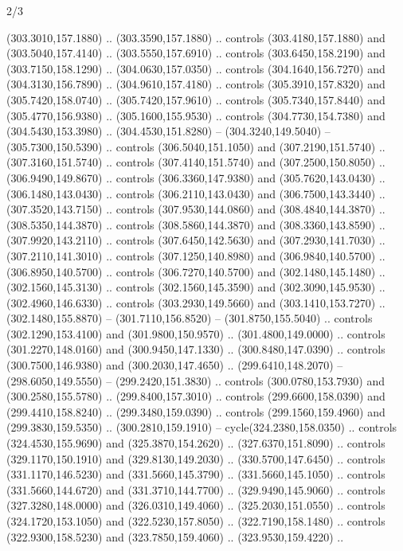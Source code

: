 \begin{flagdescription}{2/3}
\begin{scope}[xshift=0.5\flaglength,yshift=0.5\flagwidth,scale=\stretchfactor]
\begin{scope}[scale=0.001645\flagwidth,yshift=65mm,xshift=-63mm]
\begin{scope}[y=0.80pt, x=0.80pt, yscale=-1,]
\begin{scope}[cm={{1.33333,0.0,0.0,1.33333,(0.0,1e-05)}}]
  (303.3010,157.1880) .. (303.3590,157.1880) .. controls (303.4180,157.1880) and
  (303.5040,157.4140) .. (303.5550,157.6910) .. controls (303.6450,158.2190) and
  (303.7150,158.1290) .. (304.0630,157.0350) .. controls (304.1640,156.7270) and
  (304.3130,156.7890) .. (304.9610,157.4180) .. controls (305.3910,157.8320) and
  (305.7420,158.0740) .. (305.7420,157.9610) .. controls (305.7340,157.8440) and
  (305.4770,156.9380) .. (305.1600,155.9530) .. controls (304.7730,154.7380) and
  (304.5430,153.3980) .. (304.4530,151.8280) -- (304.3240,149.5040) --
  (305.7300,150.5390) .. controls (306.5040,151.1050) and (307.2190,151.5740) ..
  (307.3160,151.5740) .. controls (307.4140,151.5740) and (307.2500,150.8050) ..
  (306.9490,149.8670) .. controls (306.3360,147.9380) and (305.7620,143.0430) ..
  (306.1480,143.0430) .. controls (306.2110,143.0430) and (306.7500,143.3440) ..
  (307.3520,143.7150) .. controls (307.9530,144.0860) and (308.4840,144.3870) ..
  (308.5350,144.3870) .. controls (308.5860,144.3870) and (308.3360,143.8590) ..
  (307.9920,143.2110) .. controls (307.6450,142.5630) and (307.2930,141.7030) ..
  (307.2110,141.3010) .. controls (307.1250,140.8980) and (306.9840,140.5700) ..
  (306.8950,140.5700) .. controls (306.7270,140.5700) and (302.1480,145.1480) ..
  (302.1560,145.3130) .. controls (302.1560,145.3590) and (302.3090,145.9530) ..
  (302.4960,146.6330) .. controls (303.2930,149.5660) and (303.1410,153.7270) ..
  (302.1480,155.8870) -- (301.7110,156.8520) -- (301.8750,155.5040) .. controls
  (302.1290,153.4100) and (301.9800,150.9570) .. (301.4800,149.0000) .. controls
  (301.2270,148.0160) and (300.9450,147.1330) .. (300.8480,147.0390) .. controls
  (300.7500,146.9380) and (300.2030,147.4650) .. (299.6410,148.2070) --
  (298.6050,149.5550) -- (299.2420,151.3830) .. controls (300.0780,153.7930) and
  (300.2580,155.5780) .. (299.8400,157.3010) .. controls (299.6600,158.0390) and
  (299.4410,158.8240) .. (299.3480,159.0390) .. controls (299.1560,159.4960) and
  (299.3830,159.5350) .. (300.2810,159.1910) -- cycle(324.2380,158.0350) ..
  controls (324.4530,155.9690) and (325.3870,154.2620) .. (327.6370,151.8090) ..
  controls (329.1170,150.1910) and (329.8130,149.2030) .. (330.5700,147.6450) ..
  controls (331.1170,146.5230) and (331.5660,145.3790) .. (331.5660,145.1050) ..
  controls (331.5660,144.6720) and (331.3710,144.7700) .. (329.9490,145.9060) ..
  controls (327.3280,148.0000) and (326.0310,149.4060) .. (325.2030,151.0550) ..
  controls (324.1720,153.1050) and (322.5230,157.8050) .. (322.7190,158.1480) ..
  controls (322.9300,158.5230) and (323.7850,159.4060) .. (323.9530,159.4220) ..

\end{scope}
\end{scope}
\end{scope}
\end{scope}
\end{flagdescription}
